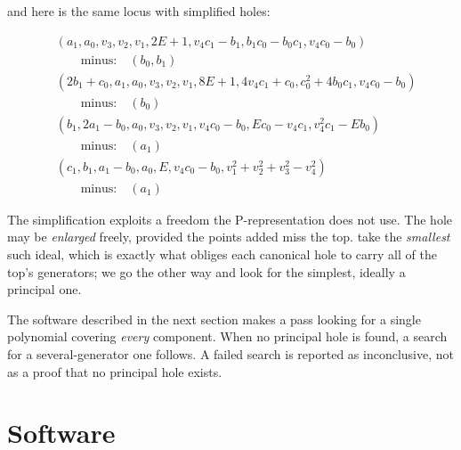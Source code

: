 \documentclass{article}
\theoremstyle{definition}
\theoremstyle{plain}
\begin{document}
and here is the same locus with simplified holes:

\begin{subequations}
\begin{align}
& \left(a_{1}, a_{0}, v_{3}, v_{2}, v_{1}, 2 E + 1, v_{4} c_{1} - b_{1}, b_{1} c_{0} - b_{0} c_{1}, v_{4} c_{0} - b_{0}\right) \\
& \qquad\text{minus:}\quad \left(b_{0}, b_{1}\right) \nonumber \\
& \left(2 b_{1} + c_{0}, a_{1}, a_{0}, v_{3}, v_{2}, v_{1}, 8 E + 1, 4 v_{4} c_{1} + c_{0}, c_{0}^{2} + 4 b_{0} c_{1}, v_{4} c_{0} - b_{0}\right) \\
& \qquad\text{minus:}\quad \left(b_{0}\right) \nonumber \\
& \left(b_{1}, 2 a_{1} - b_{0}, a_{0}, v_{3}, v_{2}, v_{1}, v_{4} c_{0} - b_{0}, E c_{0} - v_{4} c_{1}, v_{4}^{2} c_{1} - E b_{0}\right) \\
& \qquad\text{minus:}\quad \left(a_{1}\right) \nonumber \\
& \left(c_{1}, b_{1}, a_{1} - b_{0}, a_{0}, E, v_{4} c_{0} - b_{0}, v_{1}^{2} + v_{2}^{2} + v_{3}^{2} - v_{4}^{2}\right) \\
& \qquad\text{minus:}\quad \left(a_{1}\right) \nonumber
\end{align}
\end{subequations}

\medskip
The simplification exploits a freedom the P-representation does not use.  The
hole may be
{\it enlarged} freely, provided the points added miss the top.
\cite{BrunatMontes} take the {\it smallest} such ideal,
which is exactly what obliges each canonical hole to carry all of the top's
generators; we go the other way and look for the simplest, ideally a principal
one.

The software described in the next section makes
a pass looking for a single
polynomial covering {\it every} component.
When no principal hole is found, a search for a several-generator
one follows.
A failed search is reported as inconclusive, not as a proof that no
principal hole exists.

\vfill\eject
\section{Software}
\label{sec:Software}

\end{document}
